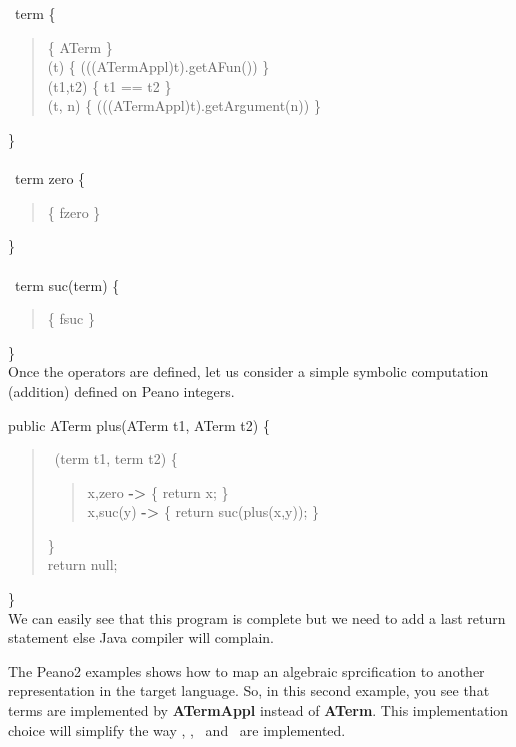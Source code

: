 \typeterm\ term \{\\
\begin{quote}
 \implement           \{ ATerm \}\\
 \getfs(t)      \{ (((ATermAppl)t).getAFun()) \}\\
 \cmpfs(t1,t2)  \{ t1 == t2 \}\\
 \gets(t, n)   \{ (((ATermAppl)t).getArgument(n)) \}\\
\end{quote}
\}\\
\\
\op\ term zero \{\\
\begin{quote}
\fsym \{ fzero \}\\
\end{quote}
\}\\
\\
\op\ term suc(term) \{\\
\begin{quote}
  \fsym \{ fsuc \}\\
\end{quote}
\}\\

Once the operators are defined, let us consider a simple symbolic
computation (addition) defined on Peano integers.

public ATerm plus(ATerm t1, ATerm t2) \{\\
\begin{quote}
 \match\ (term t1, term t2) \{\\
\begin{quote}
  x,zero   \textbf{->} \{ return x; \}\\
  x,suc(y) \textbf{->} \{ return suc(plus(x,y)); \}\\
\end{quote}
  \}\\
  return null;\\
\end{quote}
\}\\

We can easily see that this program is complete but we need to add a
last return statement else Java compiler will complain.

The Peano2 examples shows how to map an algebraic sprcification to
another representation in the target language. So, in this second
example, you see that terms are \textsf{implemented} by \textbf{ATermAppl} instead
of \textbf{ATerm}. This implementation choice will simplify the way
\implement, \getfs, \cmpfs\ and \gets\ are implemented.

